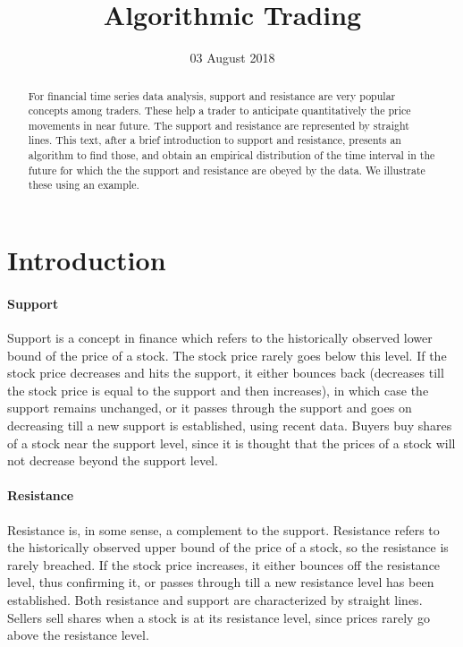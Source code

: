 \documentclass[a4paper]{article}
\title{Algorithmic Trading}
\date{03 August 2018}
\numberwithin{equation}{subsection}
\begin{document}
\maketitle

\begin{abstract}
For financial time series data analysis, support and resistance are very popular concepts among
traders. These help a trader to anticipate quantitatively the price movements in near future. The support and
resistance are represented by straight lines. This text, after a brief introduction to support and resistance,
presents an algorithm to find those, and obtain an empirical distribution of the time interval in the future for which the the support and resistance are obeyed by the data. We illustrate these using an example.
\end{abstract}

\section{Introduction}
\label{sec:introduction}

\paragraph{Support}
Support is a concept in finance which refers to the historically observed lower bound of the price of a stock. The stock price rarely goes below this level. If the stock price decreases and hits the support, it either bounces back (decreases till the stock price is equal to the support and then increases), in which case the support remains unchanged, or it passes through the support and goes on decreasing till a new support is established, using recent data. Buyers buy shares of a stock near the support level, since it is thought that the prices of a stock will not decrease beyond the support level.

\paragraph{Resistance}
Resistance is, in some sense, a complement to the support. Resistance refers to the historically observed upper bound of the price of a stock, so the resistance is rarely breached. If the stock price increases, it either bounces off the resistance level, thus confirming it, or passes through till a new resistance level has been established. Both resistance and support are characterized by straight lines. Sellers sell shares when a stock is at its resistance level, since prices rarely go above the resistance level.
\end{document}

